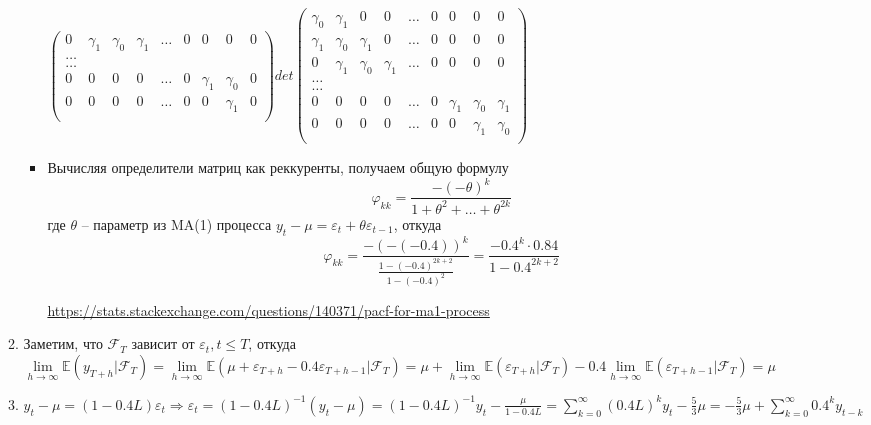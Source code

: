 \documentclass{article}
\begin{document}
\begin{enumerate}
\begin{enumerate}
\begin{itemize}
\begin{center}
\begin{math}
{\begin{pmatrix}
                    0 & \gamma_1 & \gamma_0 & \gamma_1 & \hdots &  0 & 0 & 0 & 0\\
                    \hdots \\
                    \hdots \\
                    0 & 0 & 0 & 0 & \hdots & 0 & \gamma_1 & \gamma_0 & 0\\
                    0 & 0 & 0 & 0 & \hdots & 0 & 0 & \gamma_1 & 0\\
                \end{pmatrix}
                }
                {det
                \begin{pmatrix}
                    \gamma_0 & \gamma_1 & 0 & 0 & \hdots & 0 & 0 & 0 & 0 \\
                    \gamma_1 & \gamma_0 & \gamma_1 & 0 & \hdots & 0 & 0 & 0 & 0 \\
                    0 & \gamma_1 & \gamma_0 & \gamma_1 & \hdots &  0 & 0 & 0 & 0\\
                    \hdots \\
                    \hdots \\
                    0 & 0 & 0 & 0 & \hdots & 0 & \gamma_1 & \gamma_0 & \gamma_1 \\
                    0 & 0 & 0 & 0 & \hdots & 0 & 0 & \gamma_1 & \gamma_0 \\
                \end{pmatrix}
                }
            \end{math}
        \end{center}
        \item Вычисляя определители матриц как реккуренты, получаем общую формулу
        $$\varphi_{kk} = \frac{-(-\theta)^k}{1 + \theta^2 + \hdots + \theta^{2k}}$$
        где $\theta$ -- параметр из MA(1) процесса $y_t - \mu = \varepsilon_t + \theta \varepsilon_{t-1}$, откуда
        $$\varphi_{kk} = \frac{-(-(-0.4))^k}{\frac{1 - (-0.4)^{2k+2}}{1 - (-0.4)^2}} = \frac{-0.4^k\cdot 0.84}{1 - 0.4^{2k+2}}$$

        \url{https://stats.stackexchange.com/questions/140371/pacf-for-ma1-process}
    \end{itemize}
    \item Заметим, что $\mathcal{F}_T$ зависит от $\varepsilon_t, t\leq T$, откуда $\lim\limits_{h\rightarrow\infty}\mathbb{E}(y_{T+h}|\mathcal{F}_T) =
    \lim\limits_{h\rightarrow\infty}\mathbb{E}(\mu + \varepsilon_{T+h} - 0.4\varepsilon_{T+h-1}|\mathcal{F}_T) = \mu  +
    \lim\limits_{h\rightarrow\infty}\mathbb{E}(\varepsilon_{T+h}|\mathcal{F}_T) - 0.4\lim\limits_{h\rightarrow\infty}\mathbb{E}(\varepsilon_{T+h - 1}|\mathcal{F}_T) = \mu$
    \item $y_t - \mu = (1 - 0.4L)\varepsilon_t \Rightarrow \varepsilon_t = (1 - 0.4L)^{-1}(y_t - \mu) = (1 - 0.4L)^{-1}y_t - \frac{\mu}{1 - 0.4L} =
    \sum\limits_{k=0}^{\infty} (0.4L)^ky_t - \frac{5}{3}\mu = -\frac{5}{3}\mu + \sum\limits_{k=0}^{\infty} 0.4^k y_{t-k}$
\end{enumerate}


\end{enumerate}
\end{document}
